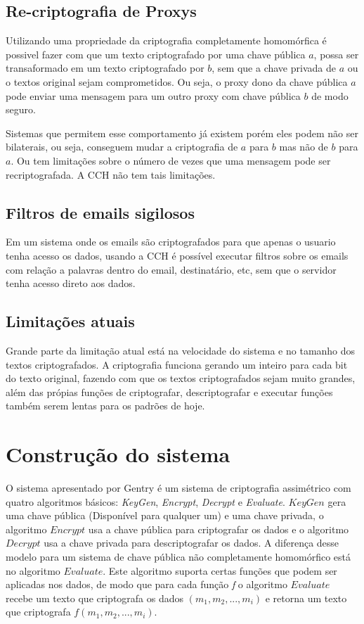 	\subsection{Re-criptografia de Proxys}
	Utilizando uma propriedade da criptografia completamente homomórfica é possivel fazer com que um texto criptografado por uma chave pública $a$, possa ser transaformado em um texto criptografado por $b$, sem que a chave privada de $a$ ou o textos original sejam comprometidos.
	Ou seja, o proxy dono da chave pública $a$ pode enviar uma mensagem para um outro proxy com chave pública $b$ de modo seguro.
	
	Sistemas que permitem esse comportamento já existem porém eles podem não ser bilaterais, ou seja, conseguem mudar a criptografia de $a$ para $b$ mas não de $b$ para $a$. Ou tem limitações sobre o número de vezes que uma mensagem pode ser recriptografada. A CCH não tem tais limitações.

	\subsection{Filtros de emails sigilosos}
	Em um sistema onde os emails são criptografados para que apenas o usuario tenha acesso os dados, usando a CCH é possível executar filtros sobre os emails com relação a palavras dentro do email, destinatário, etc, sem que o servidor tenha acesso direto aos dados.
	
	\subsection{Limitações atuais}
	Grande parte da limitação atual está na velocidade do sistema e no tamanho dos textos criptografados. A criptografia funciona gerando um inteiro para cada bit do texto original, fazendo com que os textos criptografados sejam muito grandes, além das própias funções de criptografar, descriptografar e executar funções também serem lentas para os padrões de hoje.
	
\newpage

\section{Construção do sistema}\label{sec:LABEL_CHP_1_SEC_C}
O sistema apresentado por Gentry é um sistema de criptografia assimétrico com quatro algoritmos básicos: \textit{KeyGen}, \textit{Encrypt}, \textit{Decrypt} e \textit{Evaluate}. $KeyGen$ gera uma chave pública (Disponível para qualquer um) e uma chave privada, o algoritmo $Encrypt$ usa a chave pública para criptografar os dados e o algoritmo $Decrypt$ usa a chave privada para descriptografar os dados. A diferença desse modelo para um sistema de chave pública não completamente homomórfico está no algoritmo $Evaluate$. Este algoritmo suporta certas funções que podem ser aplicadas nos dados, de modo que para cada função \textit{f} o algoritmo $Evaluate$ recebe um texto que criptografa os dados $(m_1, m_2, ..., m_i)$ e retorna um texto que criptografa $f(m_1, m_2, ..., m_i)$.

